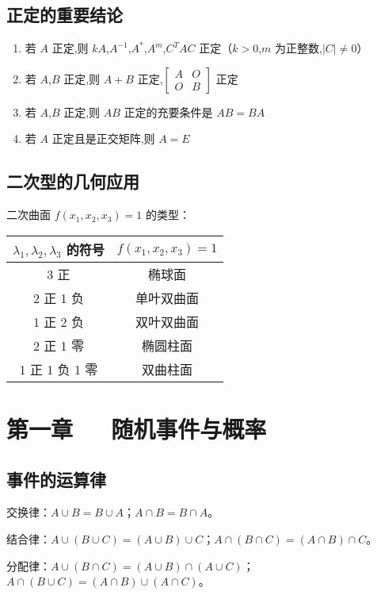 \documentclass[UTF8]{ctexart}
\theoremstyle{remark}
\begin{document}
	\subsection{正定的重要结论}
	\begin{enumerate}
		\item 若 \(A\) 正定,则 \(kA\),\(A^{-1}\),\(A^*\),\(A^m\),\(C^TAC\) 正定（\(k > 0\),\(m\) 为正整数,\(|C| \neq 0\)）
		\item 若 \(A\),\(B\) 正定,则 \(A + B\) 正定,\(\begin{bmatrix}A & O\\O & B\end{bmatrix}\) 正定
		\item 若 \(A\),\(B\) 正定,则 \(AB\) 正定的充要条件是 \(AB = BA\)
		\item 若 \(A\) 正定且是正交矩阵,则 \(A = E\)
	\end{enumerate}
	
	\subsection{二次型的几何应用}
	二次曲面 \(f(x_1, x_2, x_3) = 1\) 的类型：
	\begin{table}[H]
		\centering
		\begin{tabular}{cc}
			\toprule
			\(\lambda_1, \lambda_2, \lambda_3\) 的符号 & \(f(x_1, x_2, x_3) = 1\) \\
			\midrule
			3 正 & 椭球面 \\
			2 正 1 负 & 单叶双曲面 \\
			1 正 2 负 & 双叶双曲面 \\
			2 正 1 零 & 椭圆柱面 \\
			1 正 1 负 1 零 & 双曲柱面 \\
			\bottomrule
		\end{tabular}
	\end{table}
	
	\section{第一章~~~随机事件与概率}
	\subsection{事件的运算律}
	交换律：\(A \cup B = B \cup A\)；\(A \cap B = B \cap A\)。
	
	结合律：\(A \cup (B \cup C) = (A \cup B) \cup C\)；\(A \cap (B \cap C) = (A \cap B) \cap C\)。
	
	分配律：\(A \cup (B \cap C) = (A \cup B) \cap (A \cup C)\)；\(A \cap (B \cup C) = (A \cap B) \cup (A \cap C)\)。
	
\end{document}
